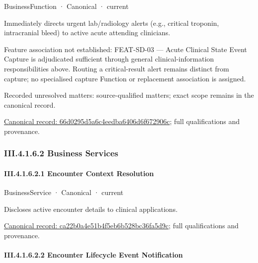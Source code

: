\label{element:66d0295d5a6c4eedba6406d6f672906c}
{\small BusinessFunction · Canonical · current}\par

Immediately directs urgent lab/radiology alerts (e.g., critical troponin, intracranial bleed) to active acute attending clinicians.



Feature association not established: FEAT-SD-03 — Acute Clinical State Event Capture is adjudicated sufficient through general clinical-information responsibilities above. Routing a critical-result alert remains distinct from capture; no specialised capture Function or replacement association is assigned.


{\small Recorded unresolved matters: source-qualified matters; exact scope remains in the canonical record.}\par
{\footnotesize \href{../../../../../../../continuum/business/business-function/66d0295d5a6c4eedba6406d6f672906c.md}{Canonical record: 66d0295d5a6c4eedba6406d6f672906c}; full qualifications and provenance.}\par
\subsubsection*{III.4.1.6.2 Business Services}
\label{navigation:III.4.1.6.2}

\paragraph*{III.4.1.6.2.1 Encounter Context Resolution}
\label{navigation:III.4.1.6.2.1}

\label{element:ca22b0a4e51b4f5eb6b528bc36fa5d9c}
{\small BusinessService · Canonical · current}\par

Discloses active encounter details to clinical applications.


{\footnotesize \href{../../../../../../../continuum/business/business-service/ca22b0a4e51b4f5eb6b528bc36fa5d9c.md}{Canonical record: ca22b0a4e51b4f5eb6b528bc36fa5d9c}; full qualifications and provenance.}\par
\paragraph*{III.4.1.6.2.2 Encounter Lifecycle Event Notification}
\label{navigation:III.4.1.6.2.2}

